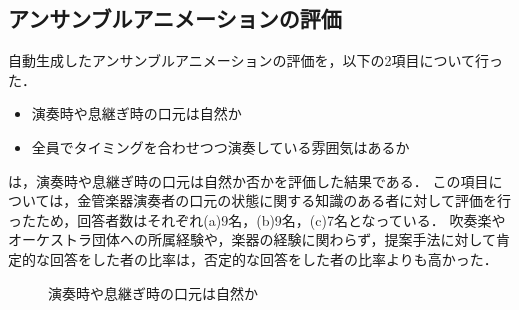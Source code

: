 \subsection{アンサンブルアニメーションの評価}
自動生成したアンサンブルアニメーションの評価を，以下の2項目について行った．
\begin{itemize}
	\item 演奏時や息継ぎ時の口元は自然か
	\item 全員でタイミングを合わせつつ演奏している雰囲気はあるか
\end{itemize}
\par
{}は，演奏時や息継ぎ時の口元は自然か否かを評価した結果である．
この項目については，金管楽器演奏者の口元の状態に関する知識のある者に対して評価を行ったため，回答者数はそれぞれ(a)9名，(b)9名，(c)7名となっている．
吹奏楽やオーケストラ団体への所属経験や，楽器の経験に関わらず，提案手法に対して肯定的な回答をした者の比率は，否定的な回答をした者の比率よりも高かった．
\begin{figure}[!h]
	\centering
	\caption{演奏時や息継ぎ時の口元は自然か}
	\label{fig:Q3-1}
\end{figure}
\par
